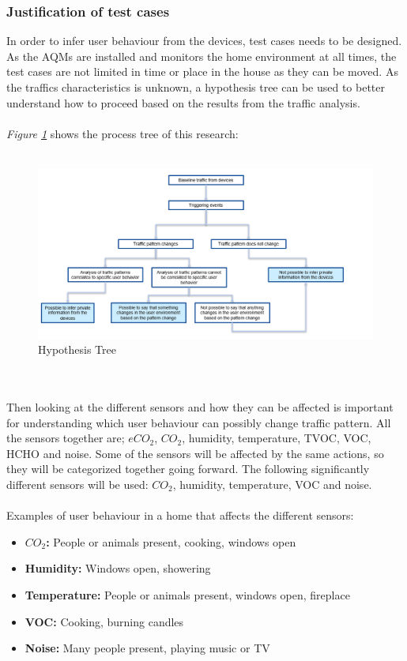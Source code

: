 \subsubsection{Justification of test cases}
In order to infer user behaviour from the devices, test cases needs to be designed. As the AQMs are installed and monitors the home environment at all times, the test cases are not limited in time or place in the house as they can be moved. As the traffics characteristics is unknown, a hypothesis tree can be used to better understand how to proceed based on the results from the traffic analysis. 
\\\\
\textit{Figure \ref{fig:HypothesisTree}} shows the process tree of this research:
\\\\
\begin{figure} [!ht]
    \includegraphics[width=1.3\textwidth]{figures/HypothesisTree.png}
    \centering
    \caption{Hypothesis Tree}
    \label{fig:HypothesisTree}
\end{figure}
\\\\
Then looking at the different sensors and how they can be affected is important for understanding which user behaviour can possibly change traffic pattern. All the sensors together are; \(eCO_2\), \(CO_2\), humidity, temperature, TVOC, VOC, HCHO and noise. Some of the sensors will be affected by the same actions, so they will be categorized together going forward. The following significantly different sensors will be used: \(CO_2\), humidity, temperature, VOC and noise. 
\\\\
Examples of user behaviour in a home that affects the different sensors:
\begin{itemize}
    \item \textbf{\(CO_2\):} People or animals present, cooking, windows open
    \item \textbf{Humidity:} Windows open, showering
    \item \textbf{Temperature:} People or animals present, windows open, fireplace
    \item \textbf{VOC:} Cooking, burning candles
    \item \textbf{Noise:} Many people present, playing music or TV
\end{itemize}


